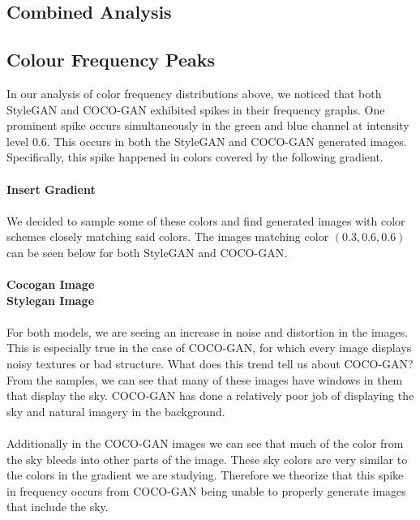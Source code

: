 \documentclass[10pt]{article}
\begin{document}
\begin{multicols*}{2}
        \section{Combined Analysis}
        \label{sec:combinedAnalysis}
        \subsection{Colour Frequency Peaks}
        In our analysis of color frequency distributions above, we noticed that both StyleGAN and COCO-GAN exhibited spikes in their frequency graphs.
        One prominent spike occurs simultaneously in the green and blue channel at intensity level 0.6.
        This occurs in both the StyleGAN and COCO-GAN generated images.
        Specifically, this spike happened in colors covered by the following gradient.
        \\\\
        \textbf{Insert Gradient}
        \\\\
        We decided to sample some of these colors and find generated images with color schemes closely matching said colors.
        The images matching color $(0.3, 0.6, 0.6)$ can be seen below for both StyleGAN and COCO-GAN.
        \\\\
        \textbf{Cocogan Image}\\
        \textbf{Stylegan Image}
        \\\\
        For both models, we are seeing an increase in noise and distortion in the images.
        This is especially true in the case of COCO-GAN, for which every image displays noisy textures or bad structure.
        What does this trend tell us about COCO-GAN?
        From the samples, we can see that many of these images have windows in them that display the sky.
        COCO-GAN has done a relatively poor job of displaying the sky and natural imagery in the background.
        \\\\
        Additionally in the COCO-GAN images we can see that much of the color from the sky bleeds into other parts of the image.
        These sky colors are very similar to the colors in the gradient we are studying.
        Therefore we theorize that this spike in frequency occurs from COCO-GAN being unable to properly generate images that include the sky.

\end{multicols*}
\end{document}
